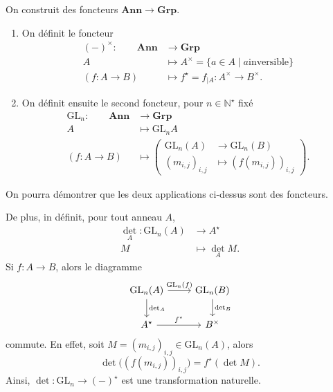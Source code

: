 \begin{exm}
  On construit des foncteurs $\mathbf{Ann} \to \mathbf{Grp}$.
  \begin{enumerate}
    \item On définit le foncteur 
      \begin{align*}
        (-)^\times: \quad\quad\mathbf{Ann} &\longrightarrow \mathbf{Grp} \\
        A &\longmapsto A^\times = \{ a \in A  \mid a \text{inversible} \} \\
        (f : A \to B) &\longmapsto f^\star = f_{|A} : A^\times \to B^\times
      .\end{align*}
    \item On définit ensuite le second foncteur, pour $n \in \mathds{N}^\star$ fixé
      \begin{align*}
        \mathrm{GL}_n: \quad\quad \mathbf{Ann} &\longrightarrow \mathbf{Grp} \\
        A &\longmapsto \mathrm{GL}_n A\\
        (f: A \to B) &\longmapsto \left(
        \begin{array}{rl}
          \mathrm{GL}_n(A) &\to \mathrm{GL}_n(B)\\
          (m_{i,j})_{i,j} &\mapsto (f(m_{i,j}))_{i,j}
        \end{array}\right)
      .\end{align*}
  \end{enumerate}

  On pourra démontrer que les deux applications ci-dessus sont des foncteurs.

  De plus, in définit, pour tout anneau $A$, \begin{align*}
    \det_A: \mathrm{GL}_n(A) &\longrightarrow A^\star \\
    M &\longmapsto \det_A M
  .\end{align*}
  Si $f : A \to B$, alors le diagramme 
  \[
  \begin{tikzcd}
    \mathrm{GL}_n(A) \arrow{r}{\mathrm{GL}_n(f)} \arrow{d}{\det_A} & \mathrm{GL}_n (B) \arrow{d}{\det_B}\\
    A^\star \arrow{r}{f^\star} & B^\times
  \end{tikzcd}
  \] commute.
  En effet, soit $M = (m_{i,j})_{i,j} \in \mathrm{GL}_n(A)$, alors \[
  \det\big((f(m_{i,j}))_{i,j}\big) = f^\star (\det M)
  .\] 
  Ainsi, $\det : \mathrm{GL}_n \to (-)^\star$ est une transformation naturelle.
\end{exm}

